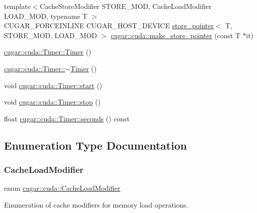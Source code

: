 \begin{DoxyCompactItemize}
\item 
{\footnotesize template$<$Cache\+Store\+Modifier S\+T\+O\+R\+E\+\_\+\+M\+OD, Cache\+Load\+Modifier L\+O\+A\+D\+\_\+\+M\+OD, typename T $>$ }\\C\+U\+G\+A\+R\+\_\+\+F\+O\+R\+C\+E\+I\+N\+L\+I\+NE C\+U\+G\+A\+R\+\_\+\+H\+O\+S\+T\+\_\+\+D\+E\+V\+I\+CE \hyperlink{structcugar_1_1cuda_1_1store__pointer}{store\+\_\+pointer}$<$ T, S\+T\+O\+R\+E\+\_\+\+M\+OD, L\+O\+A\+D\+\_\+\+M\+OD $>$ \hyperlink{group___c_u_d_a_module_gac33a192d849e90b34a7011346c76e3f6}{cugar\+::cuda\+::make\+\_\+store\+\_\+pointer} (const T $\ast$it)
\item 
\hyperlink{group___c_u_d_a_module_ga27675d4d89a40e592d9f85789d951604}{cugar\+::cuda\+::\+Timer\+::\+Timer} ()
\item 
\hyperlink{group___c_u_d_a_module_gae7e683c7100a98ed350987e39e221c67}{cugar\+::cuda\+::\+Timer\+::$\sim$\+Timer} ()
\item 
void \hyperlink{group___c_u_d_a_module_ga01d05872296e3fde547ec5f57b092038}{cugar\+::cuda\+::\+Timer\+::start} ()
\item 
void \hyperlink{group___c_u_d_a_module_gaa3d28081d1d907e01ad0533197189009}{cugar\+::cuda\+::\+Timer\+::stop} ()
\item 
float \hyperlink{group___c_u_d_a_module_ga86d41374527206653bad805dd13adfbc}{cugar\+::cuda\+::\+Timer\+::seconds} () const
\end{DoxyCompactItemize}


\subsection{Enumeration Type Documentation}
\mbox{\label{group___c_u_d_a_module_ga6dd203ab0e1210c1f65dffe2427a8278}} 
\subsubsection{\texorpdfstring{Cache\+Load\+Modifier}{CacheLoadModifier}}
{\footnotesize\ttfamily enum \hyperlink{group___c_u_d_a_module_ga6dd203ab0e1210c1f65dffe2427a8278}{cugar\+::cuda\+::\+Cache\+Load\+Modifier}}



Enumeration of cache modifiers for memory load operations. 


